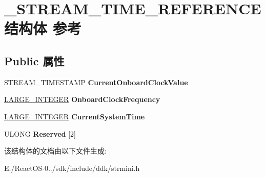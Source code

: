 \hypertarget{struct___s_t_r_e_a_m___t_i_m_e___r_e_f_e_r_e_n_c_e}{}\section{\+\_\+\+S\+T\+R\+E\+A\+M\+\_\+\+T\+I\+M\+E\+\_\+\+R\+E\+F\+E\+R\+E\+N\+C\+E结构体 参考}
\label{struct___s_t_r_e_a_m___t_i_m_e___r_e_f_e_r_e_n_c_e}
\subsection*{Public 属性}
\begin{DoxyCompactItemize}
\item 
\mbox{\label{struct___s_t_r_e_a_m___t_i_m_e___r_e_f_e_r_e_n_c_e_a14ea4a3fa2eb594f3cc3e0ce05367a3c}} 
S\+T\+R\+E\+A\+M\+\_\+\+T\+I\+M\+E\+S\+T\+A\+MP {\bfseries Current\+Onboard\+Clock\+Value}
\item 
\mbox{\label{struct___s_t_r_e_a_m___t_i_m_e___r_e_f_e_r_e_n_c_e_a34b678daec57117d1e5fd73ab8f8555c}} 
\hyperlink{union___l_a_r_g_e___i_n_t_e_g_e_r}{L\+A\+R\+G\+E\+\_\+\+I\+N\+T\+E\+G\+ER} {\bfseries Onboard\+Clock\+Frequency}
\item 
\mbox{\label{struct___s_t_r_e_a_m___t_i_m_e___r_e_f_e_r_e_n_c_e_afcf9d1cc5d2a35a13b26b266e538829c}} 
\hyperlink{union___l_a_r_g_e___i_n_t_e_g_e_r}{L\+A\+R\+G\+E\+\_\+\+I\+N\+T\+E\+G\+ER} {\bfseries Current\+System\+Time}
\item 
\mbox{\label{struct___s_t_r_e_a_m___t_i_m_e___r_e_f_e_r_e_n_c_e_a3f76754733ba24e5f78a5259fe4b9520}} 
U\+L\+O\+NG {\bfseries Reserved} \mbox{[}2\mbox{]}
\end{DoxyCompactItemize}


该结构体的文档由以下文件生成\+:\begin{DoxyCompactItemize}
\item 
E\+:/\+React\+O\+S-\/0../sdk/include/ddk/strmini.\+h\end{DoxyCompactItemize}
